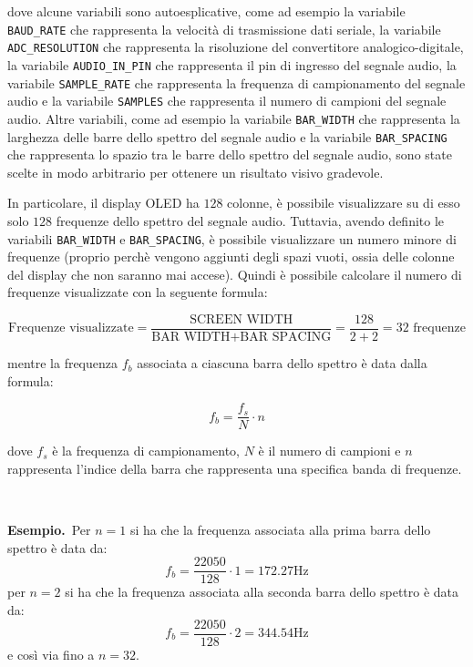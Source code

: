 \documentclass[a4paper,12pt]{report}  %
\newcommand{\namedparagraph}[2]{%
    \noindent\colorbox{cyan!20}{\parbox{\dimexpr\linewidth-2\fboxsep}{\textbf{#1}~#2}}%
}
\newcommand{\lstinlinebg}[1]{\colorbox{backcolour}{\lstinline|#1|}}
\begin{document}
dove alcune variabili sono autoesplicative, come ad esempio la variabile \lstinlinebg{BAUD_RATE} che rappresenta la velocità di trasmissione dati seriale, la variabile \lstinlinebg{ADC_RESOLUTION} che rappresenta la risoluzione del convertitore analogico-digitale, la variabile \lstinlinebg{AUDIO_IN_PIN} che rappresenta il pin di ingresso del segnale audio, la variabile \lstinlinebg{SAMPLE_RATE} che rappresenta la frequenza di campionamento del segnale audio e la variabile \lstinlinebg{SAMPLES} che rappresenta il numero di campioni del segnale audio.
Altre variabili, come ad esempio la variabile \lstinlinebg{BAR_WIDTH} che rappresenta la larghezza delle barre dello spettro del segnale audio e la variabile \lstinlinebg{BAR_SPACING} che rappresenta lo spazio tra le barre dello spettro del segnale audio, sono state scelte in modo arbitrario per ottenere un risultato visivo gradevole.

In particolare, il display OLED ha $128$ colonne, è possibile visualizzare su di esso solo $128$ frequenze dello spettro del segnale audio.
Tuttavia, avendo definito le variabili \lstinlinebg{BAR_WIDTH} e \lstinlinebg{BAR_SPACING}, è possibile visualizzare un numero minore di frequenze (proprio perchè vengono aggiunti degli spazi vuoti, ossia delle colonne del display che non saranno mai accese).
Quindi è possibile calcolare il numero di frequenze visualizzate con la seguente formula:

\begin{equation}
    \text{Frequenze visualizzate} = \frac{\text{SCREEN WIDTH}}{\text{BAR WIDTH} + \text{BAR SPACING}} = \frac{128}{2 + 2} = 32 \text{ frequenze} \nonumber
\end{equation}

mentre la frequenza $f_b$ associata a ciascuna barra dello spettro è data dalla formula:

\begin{equation}
    f_b = \frac{f_s}{N} \cdot n \nonumber
\end{equation}

dove $f_s$ è la frequenza di campionamento, $N$ è il numero di campioni e $n$ rappresenta l'indice della barra che rappresenta una specifica banda di frequenze.

\noindent\\ \namedparagraph{Esempio.}{Per $n = 1$ si ha che la frequenza associata alla prima barra dello spettro è data da:
\begin{equation}
    f_b = \frac{22050}{128} \cdot 1 = 172.27 \text{Hz} \nonumber
\end{equation}
per $n = 2$ si ha che la frequenza associata alla seconda barra dello spettro è data da:
\begin{equation}
    f_b = \frac{22050}{128} \cdot 2 = 344.54 \text{Hz} \nonumber
\end{equation}
e così via fino a $n = 32$.}
\end{document}
